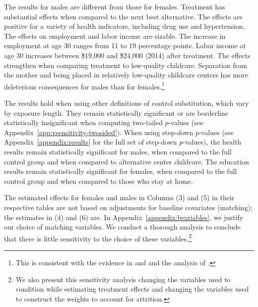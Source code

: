 The results for males are different from those for females. Treatment has substantial effects when compared to the next best alternative. The effects are positive for a variety of health indicators, including drug use and hypertension. The effects on employment and labor income are sizable. The increase in employment at age 30 ranges from 11 to 19 percentage points. Labor income at age 30 increases between \$19,000 and \$24,000 (2014) after treatment. The effects strengthen when comparing treatment to low-quality childcare. Separation from the mother and being placed in relatively low-quality childcare centers has more deleterious consequences for males than for females.\footnote{This is consistent with the evidence in \citet{Kottelenberg_Lehrer_2014_Gender-Effects} and \citet{Baker_Gruber_Milligan_2015_Noncog_Defects} and the analysis of \citet{Golding_Fitzgerald_2017_IMHJ}.}

The results hold when using other definitions of control substitution, which vary by exposure length. They remain statistically significant or are borderline statistically insignificant when computing two-tailed $p$-values (see Appendix~\ref{app:vsensitivity-twosided}). When using step-down $p$-values (see Appendix~\ref{appendix:results} for the full set of step-down $p$-values), the health results remain statistically significant for males, when compared to the full control group and when compared to alternative center childcare. The education results remain statistically significant for females, when compared to the full control group and when compared to those who stay at home.

The estimated effects for females and males in Columns (3) and (5) in their respective tables are not based on adjustments for baseline covariates (matching); the estimates in (4) and (6) are. In Appendix~\ref{appendix:bvariables}, we justify our choice of matching variables. We conduct a thorough analysis to conclude that there is little sensitivity to the choice of these variables.\footnote{We also present this sensitivity analysis changing the variables used to condition while estimating treatment effects and changing the variables used to construct the weights to account for attrition.}


